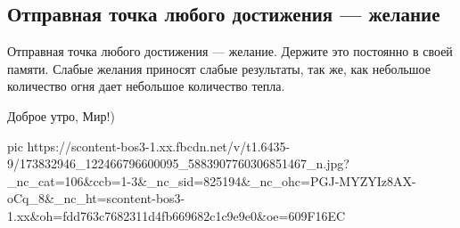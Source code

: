  
 
 
 
 
\subsection{Отправная точка любого достижения — желание}

Отправная точка любого достижения — желание. Держите это постоянно в своей
памяти. Слабые желания приносят слабые результаты, так же, как небольшое
количество огня дает небольшое количество тепла.

Доброе утро, Мир!)

\ifcmt
  pic https://scontent-bos3-1.xx.fbcdn.net/v/t1.6435-9/173832946_122466796600095_5883907760306851467_n.jpg?_nc_cat=106&ccb=1-3&_nc_sid=825194&_nc_ohc=PGJ-MYZYIz8AX-oCq_8&_nc_ht=scontent-bos3-1.xx&oh=fdd763c7682311d4fb669682c1c9e9e0&oe=609F16EC
\fi

